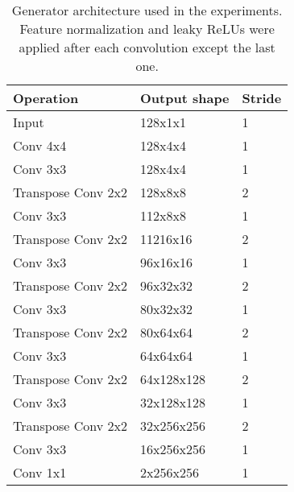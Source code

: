 \begin{table}[t]
    \centering
    \caption{Generator architecture used in the experiments. Feature normalization and leaky ReLUs were applied after each convolution except the last one.}
    \label{tab:generator}
    \begin{tabular}{|lll|}
        \hline
        Operation          & Output shape     & Stride \\ \hline
        Input              & 128x1x1   & 1      \\
        Conv 4x4           & 128x4x4   & 1      \\
        Conv 3x3           & 128x4x4   & 1      \\ \hline
        Transpose Conv 2x2 & 128x8x8   & 2      \\
        Conv 3x3           & 112x8x8   & 1      \\ \hline
        Transpose Conv 2x2 & 11216x16   & 2      \\
        Conv 3x3           & 96x16x16   & 1      \\ \hline
        Transpose Conv 2x2 & 96x32x32   & 2      \\
        Conv 3x3           & 80x32x32   & 1      \\ \hline
        Transpose Conv 2x2 & 80x64x64   & 2      \\
        Conv 3x3           & 64x64x64   & 1      \\ \hline
        Transpose Conv 2x2 & 64x128x128   & 2      \\
        Conv 3x3           & 32x128x128   & 1      \\ \hline
        Transpose Conv 2x2 & 32x256x256   & 2      \\
        Conv 3x3           & 16x256x256   & 1      \\ \hline
        Conv 1x1           & 2x256x256 & 1        \\ \hline
    \end{tabular}
\end{table}

